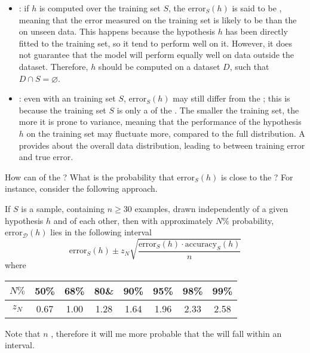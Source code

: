 \documentclass[a4paper, 12pt]{report}
\begin{document}
    \begin{itemize}
        \item {}: if $h$ is computed over the training set $S$, the $\mathrm{error}_S(h)$ is said to be , meaning that the error measured on the training set is likely to be  than the  on unseen data. This happens because the hypothesis $h$ has been directly fitted to the training set, so it tend to perform well on it. However, it does not guarantee that the model will perform equally well on data outside the dataset. Therefore, $h$ should be computed on a dataset $D$, such that $D \cap S = \varnothing$.
        \item {}: even with an  training set $S$, $\mathrm{error}_S(h)$ may still differ from the ; this is because the training set $S$ is only a  of the . The smaller the training set, the more it is prone to variance, meaning that the performance of the hypothesis $h$ on the training set may fluctuate more, compared to the full distribution. A  provides  about the overall data distribution, leading to  between training error and true error.
    \end{itemize}

    How can  of the ? What is the probability that $\mathrm{error}_S(h)$ is close to the ? For instance, consider the following approach.

    \begin{example}
        If $S$ is a sample, containing $n \ge 30$ examples, drawn independently of a given hypothesis $h$ and of each other, then with approximately $N\%$ probability, $\mathrm{error}_\mathcal D(h)$ lies in the following interval $$\mathrm{error}_S(h) \pm z_N \sqrt{\dfrac{\mathrm{error}_S(h) \cdot \mathrm{accuracy}_S(h)}{n}}$$ where
        \begin{table}[H]
            \centering
            \begin{tabular}{c|ccccccc}
                $N\%$ & 50\% & 68\% & 80\& & 90\% & 95\% & 98\% & 99\% \\
                \hline
                $z_N$ & 0.67 & 1.00 & 1.28 & 1.64 & 1.96 & 2.33 & 2.58
            \end{tabular}
        \end{table}

        Note that  $n$ , therefore it will me more probable that the  will fall within an interval.
    \end{example}
\end{document}
